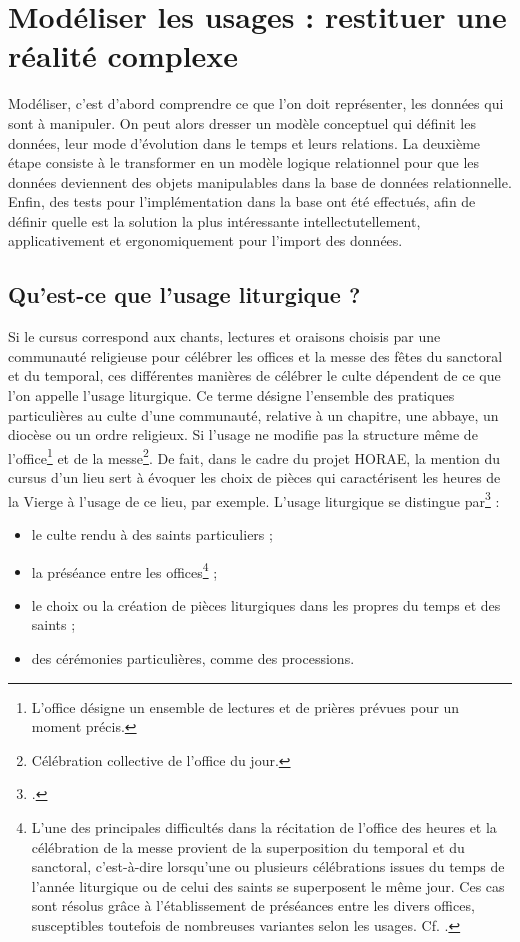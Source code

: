 \documentclass[a4paper,12pt,twoside]{book}
\begin{document}
	\section{Modéliser les usages : restituer une réalité complexe }
	
	Modéliser, c'est d'abord comprendre ce que l'on doit représenter, les données qui sont à manipuler. On peut alors dresser un modèle conceptuel qui définit les données, leur mode d'évolution dans le temps et leurs relations. La deuxième étape consiste à le transformer en un modèle logique relationnel pour que les données deviennent des objets manipulables dans la base de données relationnelle. Enfin, des tests pour l'implémentation dans la base ont été effectués, afin de définir quelle est la solution la plus intéressante intellectutellement, applicativement et ergonomiquement pour l'import des données.
	
	\subsection{Qu’est-ce que l'usage liturgique ?}
	
	Si le cursus correspond aux chants, lectures et oraisons choisis par une communauté religieuse pour célébrer les offices et la messe des fêtes du sanctoral et du temporal, ces différentes manières de célébrer le culte dépendent de ce que l'on appelle l'usage liturgique. Ce terme désigne l’ensemble des pratiques particulières au culte d’une communauté, relative à un chapitre, une abbaye, un diocèse ou un ordre religieux. Si l'usage ne modifie pas la structure même de l'office\footnote{L'office désigne un ensemble de lectures et de prières prévues pour un moment précis.} et de la messe\footnote{Célébration collective de l'office du jour.}. De fait, dans le cadre du projet HORAE, la mention du cursus d'un lieu sert à évoquer les choix de pièces qui caractérisent les heures de la Vierge à l'usage de ce lieu, par exemple. L'usage liturgique se distingue par\footcite{usages_lit} : 
	\begin{itemize}
	    \item le culte rendu à des saints particuliers ;
	    \item la préséance entre les offices\footnote{L'une des principales difficultés dans la récitation de l’office des heures et la célébration de la messe provient de la superposition du temporal et du sanctoral, c’est-à-dire lorsqu’une ou plusieurs célébrations issues du temps de l'année liturgique ou de celui des saints se superposent le même jour. Ces cas sont résolus grâce à l’établissement de préséances entre les divers offices, susceptibles toutefois de nombreuses variantes selon les usages. Cf. \cite{preseance_offices}.} ;
	    \item le choix ou la création de pièces liturgiques dans les propres du temps et des saints ;
	    \item des cérémonies particulières, comme des processions.
	\end{itemize}
	
\end{document}
